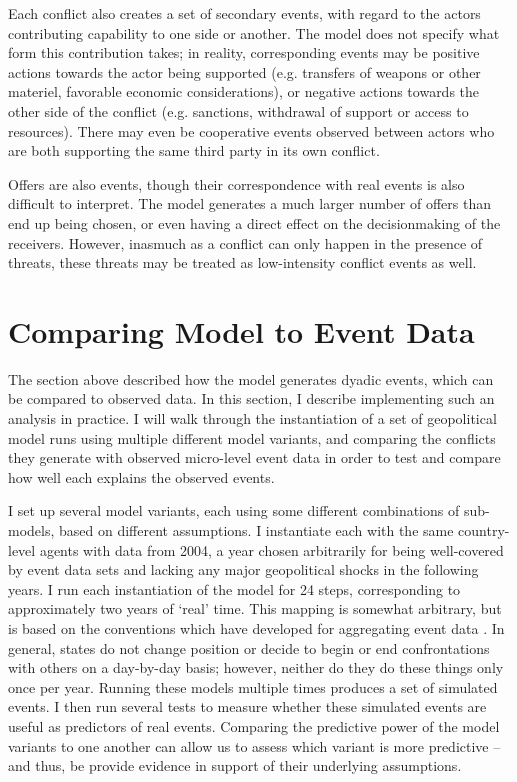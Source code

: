 Each conflict also creates a set of secondary events, with regard to the actors contributing capability to one side or another. The model does not specify what form this contribution takes; in reality, corresponding events may be positive actions towards the actor being supported (e.g. transfers of weapons or other materiel, favorable economic considerations), or negative actions towards the other side of the conflict (e.g. sanctions, withdrawal of support or access to resources). There may even be cooperative events observed between actors who are both supporting the same third party in its own conflict.

Offers are also events, though their correspondence with real events is also difficult to interpret. The model generates a much larger number of offers than end up being chosen, or even having a direct effect on the decisionmaking of the receivers. However, inasmuch as a conflict can only happen in the presence of threats, these threats may be treated as low-intensity conflict events as well.

\section{Comparing Model to Event Data} \label{icews}

The section above described how the model generates dyadic events, which can be compared to observed data. In this section, I describe implementing such an analysis in practice. I will walk through the instantiation of a set of geopolitical model runs using multiple different model variants, and comparing the conflicts they generate with observed micro-level event data in order to test and compare how well each explains the observed events. 

I set up several model variants, each using some different combinations of sub-models, based on different assumptions. I instantiate each with the same country-level agents with data from 2004, a year chosen arbitrarily for being well-covered by event data sets and lacking any major geopolitical shocks in the following years. I run each instantiation of the model for 24 steps, corresponding to approximately two years of `real' time. This mapping is somewhat arbitrary, but is based on the conventions which have developed for aggregating event data \citep{yonamine_2011}. In general, states do not change position or decide to begin or end confrontations with others on a day-by-day basis; however, neither do they do these things only once per year. Running these models multiple times produces a set of simulated events. I then run several tests to measure whether these simulated events are useful as predictors of real events. Comparing the predictive power of the model variants to one another can allow us to assess which variant is more predictive -- and thus, be provide evidence in support of their underlying assumptions.

